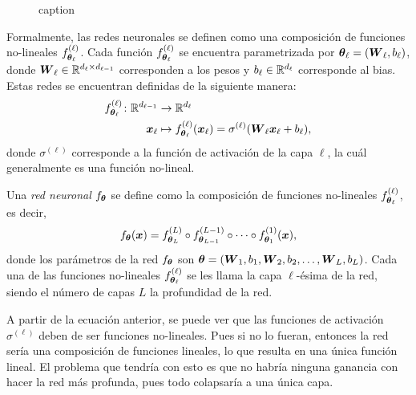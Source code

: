 {{\begin{figure}[htbp]
    \centering
    \caption{caption}
    \label{fig:ejemplo-red-neuronal}
\end{figure}



Formalmente, las redes neuronales se definen como una composición de funciones no-lineales $f^{(\ell)}_{\vb*{\theta}_\ell}$. Cada función $f^{(\ell)}_{\vb*{\theta}_\ell}$ se encuentra parametrizada por $\vb*{\theta}_\ell = (\vb*{W}_\ell, b_\ell)$, donde $\vb*{W}_\ell \in \mathbb{R}^{d_{\ell} \times d_{\ell-1}}$ corresponden a los pesos y $b_\ell \in \mathbb{R}^{d_\ell}$ corresponde al bias. Estas redes se encuentran definidas de la siguiente manera:
\begin{align*}
    f^{(\ell)}_{\vb*{\theta}_\ell} \colon \mathbb{R}^{d_{\ell-1}} & \to \mathbb{R}^{d_\ell}                                                                         \\
    \vb*{x}_\ell                                      & \mapsto f^{(\ell)}_{\vb*{\theta}_\ell}(\vb*{x}_\ell) = \sigma^{(\ell)}(\vb*{W}_\ell \vb*{x}_\ell + b_\ell),
\end{align*}
donde $\sigma^{(\ell)}$ corresponde a la función de activación de la capa $\ell$, la cuál generalmente es una función no-lineal.

Una \emph{red neuronal} $f_{\vb*{\theta}}$ se define como la composición de funciones no-lineales $f^{(\ell)}_{\vb*{\theta}_{\ell}}$,
es decir,
\begin{equation}
    f_{\vb*{\theta}}(\vb*{x}) = f^{(L)}_{\vb*{\theta}_{L}} \circ f^{(L-1)}_{\vb*{\theta}_{L-1}} \circ \cdots \circ f^{(1)}_{\vb*{\theta}_{1}}(\vb*{x}),
\end{equation}
donde los parámetros de la red $f_{\vb*{\theta}}$ son $\vb*{\theta} = (\vb*{W}_1, b_1, \vb*{W}_2, b_2, \ldots, \vb*{W}_L, b_L)$. Cada una de las funciones no-lineales $f^{(\ell)}_{\vb*{\theta}_{\ell}}$ se les llama la capa $\ell$-ésima de la red, siendo el número de capas $L$ la profundidad de la red.

A partir de la ecuación anterior, se puede ver que las funciones de activación $\sigma^{(\ell)}$ deben de ser funciones no-lineales. Pues si no lo fueran, entonces la red sería una composición de funciones lineales, lo que resulta en una única función lineal. El problema que tendría con esto es que no habría ninguna ganancia con hacer la red más profunda, pues todo colapsaría a una única capa.

}}
